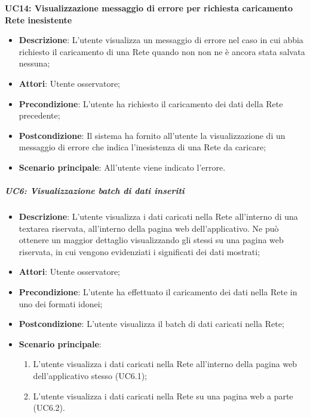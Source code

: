 \textbf{UC14: Visualizzazione messaggio di errore per richiesta caricamento Rete inesistente}\mbox{}
\label{UC14: Visualizzazione messaggio di errore per richiesta caricamento Rete inesistente}
\noindent
\begin{itemize}
\item \textbf{Descrizione}: L'utente visualizza un messaggio di errore nel caso in cui abbia richiesto il caricamento di una Rete quando non non ne \`e ancora stata salvata nessuna;
\item \textbf{Attori}: Utente osservatore;
\item \textbf{Precondizione}: L'utente ha richiesto il caricamento dei dati della Rete precedente;
\item \textbf{Postcondizione}: Il sistema ha fornito all'utente la visualizzazione di un messaggio di errore che indica l'inesistenza di una Rete da caricare;
\item \textbf{Scenario principale}: All'utente viene indicato l'errore.
\end{itemize}


\subparagraph{UC6: Visualizzazione batch di dati inseriti}\mbox{}
\label{UC6: Visualizzazione batch di dati inseriti}
\noindent
\begin{itemize}
\item \textbf{Descrizione}: L'utente visualizza i dati caricati nella Rete all'interno di una textarea riservata, all'interno della pagina web dell'applicativo. Ne pu\`o ottenere un maggior dettaglio visualizzando gli stessi su una pagina web riservata, in cui vengono evidenziati i significati dei dati mostrati;
\item \textbf{Attori}: Utente osservatore;
\item \textbf{Precondizione}: L'utente ha  effettuato il caricamento dei dati nella Rete in uno dei formati idonei;
\item \textbf{Postcondizione}: L'utente visualizza il batch di dati caricati nella Rete;
\item \textbf{Scenario principale}:
\begin{enumerate}
\item L'utente visualizza i dati caricati nella Rete all'interno della pagina web dell'applicativo stesso (UC6.1);
\item L'utente visualizza i dati caricati nella Rete su una pagina web a parte (UC6.2).
\end{enumerate}
\end{itemize}

